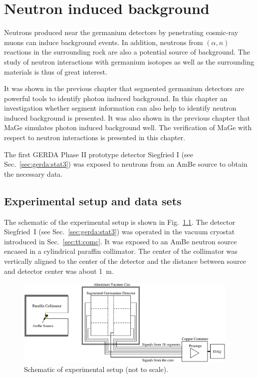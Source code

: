 \chapter{Neutron induced background}
\label{cha:neutron}
Neutrons produced near the germanium detectors by penetrating cosmic-ray muons can induce background events. In addition, neutrons from $(\alpha, n)$ reactions in the surrounding rock are also a potential source of background. The study of neutron interactions with germanium isotopes as well as the surrounding materials is thus of great interest.

It was shown in the previous chapter that segmented germanium detectors are powerful tools to identify photon induced background. In this chapter an investigation whether segment information can also help to identify neutron induced background is presented. It was also shown in the previous chapter that MaGe \cite{Mag06, Mag08} simulates photon induced background well. The verification of MaGe with respect to neutron interactions is presented in this chapter.

The first GERDA Phase II prototype detector Siegfried I (see Sec.~\ref{sec:gerda:stat3}) was exposed to neutrons from an AmBe source to obtain the necessary data.

\section{Experimental setup and data sets}
\label{sec:neu:exp}
The schematic of the experimental setup is shown in Fig.~\ref{fig:neu:exp}. The detector Siegfried~I (see Sec.~\ref{sec:gerda:stat3}) was operated in the vacuum cryostat introduced in Sec.~\ref{sec:tt:comc}. It was exposed to an AmBe neutron source encased in a cylindrical paraffin collimator. The center of the collimator was vertically aligned to the center of the detector and the distance between source and detector center was about 1~m.

\begin{figure}[tbhp]
  \centering
  \includegraphics[width=0.95\textwidth]{neuExpSI}
  \caption{Schematic of experimental setup (not to scale).}
  \label{fig:neu:exp}
\end{figure}

